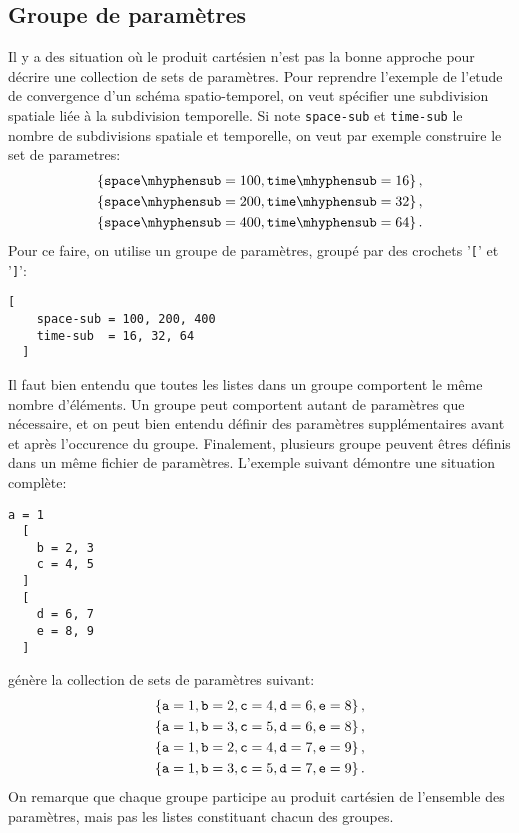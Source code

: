 \subsection{Groupe de param\`etres}
Il y a des situation o\`u le produit cart\'esien n'est pas la bonne
approche pour d\'ecrire une collection de sets de param\`etres. Pour
reprendre l'exemple de l'etude de convergence d'un sch\'ema
spatio-temporel, on veut sp\'ecifier une subdivision spatiale li\'ee
\`a la subdivision temporelle. Si note \texttt{space-sub} et
\texttt{time-sub} le nombre de subdivisions spatiale et temporelle, on
veut par exemple construire le set de parametres:
\begin{align*}
  \cparent{\mathtt{space\mhyphen sub} = 100, \mathtt{time\mhyphen sub} = 16},\\
  \cparent{\mathtt{space\mhyphen sub} = 200, \mathtt{time\mhyphen sub} = 32},\\
  \cparent{\mathtt{space\mhyphen sub} = 400, \mathtt{time\mhyphen sub} = 64}.\\
\end{align*}
Pour ce faire, on utilise un groupe de param\`etres, group\'e par des
crochets '\texttt{[}' et '\texttt{]}':
\begin{lstlisting}[language={},frame=single,basicstyle=\ttfamily]
  [
    space-sub = 100, 200, 400
    time-sub  = 16, 32, 64
  ]
\end{lstlisting}
Il faut bien entendu que toutes les listes dans un groupe comportent
le m\^eme nombre d'\'el\'ements. Un groupe peut comportent autant de
param\`etres que n\'ecessaire, et on peut bien entendu d\'efinir des
param\`etres suppl\'ementaires avant et apr\`es l'occurence du
groupe. Finalement, plusieurs groupe peuvent \^etres d\'efinis dans un
m\^eme fichier de param\`etres. L'exemple suivant d\'emontre une
situation compl\`ete:
\begin{lstlisting}[language={},frame=single,basicstyle=\ttfamily]
  a = 1
  [
    b = 2, 3
    c = 4, 5
  ]
  [
    d = 6, 7
    e = 8, 9
  ]
\end{lstlisting}
g\'en\`ere la collection de sets de param\`etres suivant:
\begin{align*}
  \left\{ \mathtt{a} = 1, \mathtt{b} = 2, \mathtt{c} = 4, \mathtt{d} = 6, \mathtt{e} = 8 \right\},\\
  \left\{ \mathtt{a} = 1, \mathtt{b} = 3, \mathtt{c} = 5, \mathtt{d} = 6, \mathtt{e} = 8 \right\},\\
  \left\{ \mathtt{a} = 1, \mathtt{b} = 2, \mathtt{c} = 4, \mathtt{d} = 7, \mathtt{e} = 9 \right\},\\
  \left\{ \mathtt{a} = 1, \mathtt{b} = 3, \mathtt{c} = 5, \mathtt{d} = 7, \mathtt{e} = 9 \right\}.
\end{align*}
On remarque que chaque groupe participe au produit cart\'esien de
l'ensemble des param\`etres, mais pas les listes constituant chacun
des groupes.

